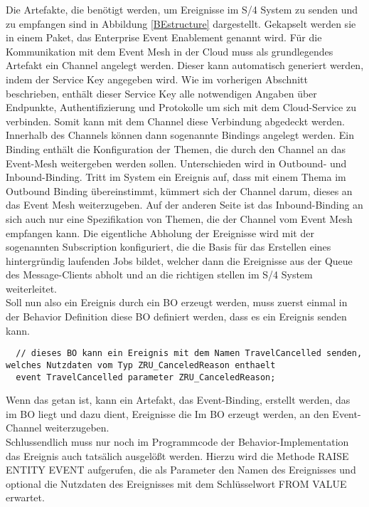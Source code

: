   Die Artefakte, die benötigt werden, um Ereignisse im S/4 System zu senden und zu empfangen sind in Abbildung \ref{BEstructure} dargestellt. Gekapselt werden sie in einem Paket, das Enterprise Event Enablement genannt wird. Für die Kommunikation mit dem Event Mesh in der Cloud muss als grundlegendes Artefakt ein Channel angelegt werden. Dieser kann automatisch generiert werden, indem der Service Key angegeben wird. Wie im vorherigen Abschnitt beschrieben, enthält dieser Service Key alle notwendigen Angaben über Endpunkte, Authentifizierung und Protokolle um sich mit dem Cloud-Service zu verbinden. Somit kann mit dem Channel diese Verbindung abgedeckt werden. Innerhalb des Channels können dann sogenannte Bindings angelegt werden. Ein Binding enthält die Konfiguration der Themen, die durch den Channel an das Event-Mesh weitergeben werden sollen. Unterschieden wird in Outbound- und Inbound-Binding. Tritt im System ein Ereignis auf, dass mit einem Thema im Outbound Binding übereinstimmt, kümmert sich der Channel darum, dieses an das Event Mesh weiterzugeben. Auf der anderen Seite ist das Inbound-Binding an sich auch nur eine Spezifikation von Themen, die der Channel vom Event Mesh empfangen kann. Die eigentliche Abholung der Ereignisse wird mit der sogenannten Subscription konfiguriert, die die Basis für das Erstellen eines hintergründig laufenden Jobs bildet, welcher dann die Ereignisse aus der Queue des Message-Clients abholt und an die richtigen stellen im S/4 System weiterleitet.\\

Soll nun also ein Ereignis durch ein \ac{BO} erzeugt werden, muss zuerst einmal in der Behavior Definition diese \ac{BO} definiert werden, dass es ein Ereignis senden kann. 

\begin{lstlisting}
  // dieses BO kann ein Ereignis mit dem Namen TravelCancelled senden, welches Nutzdaten vom Typ ZRU_CanceledReason enthaelt
  event TravelCancelled parameter ZRU_CanceledReason;
\end{lstlisting}

Wenn das getan ist, kann ein Artefakt, das Event-Binding, erstellt werden, das im \ac{BO} liegt und dazu dient, Ereignisse die Im \ac{BO} erzeugt werden, an den Event-Channel weiterzugeben.\\
Schlussendlich muss nur noch im Programmcode der Behavior-Implementation das Ereignis auch tatsälich ausgelößt werden. Hierzu wird die Methode RAISE ENTITY EVENT aufgerufen, die als Parameter den Namen des Ereignisses und optional die Nutzdaten des Ereignisses mit dem Schlüsselwort FROM VALUE erwartet.\\

